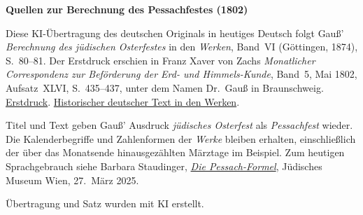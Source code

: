 \clearpage\thispagestyle{empty}
\begin{center}\textbf{Quellen zur Berechnung des Pessachfestes (1802)}\end{center}
\noindent Diese KI-Übertragung des deutschen Originals in heutiges Deutsch folgt Gauß’ \textit{Berechnung des jüdischen Osterfestes} in den \textit{Werken}, Band~VI (Göttingen, 1874), S.~80--81. Der Erstdruck erschien in Franz Xaver von Zachs \textit{Monatlicher Correspondenz zur Beförderung der Erd- und Himmels-Kunde}, Band~5, Mai 1802, Aufsatz~XLVI, S.~435--437, unter dem Namen Dr.~Gauß in Braunschweig. \href{https://www.digitale-sammlungen.de/de/view/bsb10538597?page=447}{Erstdruck}. \href{https://gdz.sub.uni-goettingen.de/id/PPN236007467}{Historischer deutscher Text in den Werken}.
\par\smallskip\noindent Titel und Text geben Gauß’ Ausdruck \textit{jüdisches Osterfest} als \textit{Pessachfest} wieder. Die Kalenderbegriffe und Zahlenformen der \textit{Werke} bleiben erhalten, einschließlich der über das Monatsende hinausgezählten Märztage im Beispiel. Zum heutigen Sprachgebrauch siehe Barbara Staudinger, \href{https://www.jmw.at/news/die_pessach-formel}{\textit{Die Pessach-Formel}}, Jüdisches Museum Wien, 27.~März 2025.
\par\smallskip\noindent Übertragung und Satz wurden mit KI erstellt.
\clearpage
